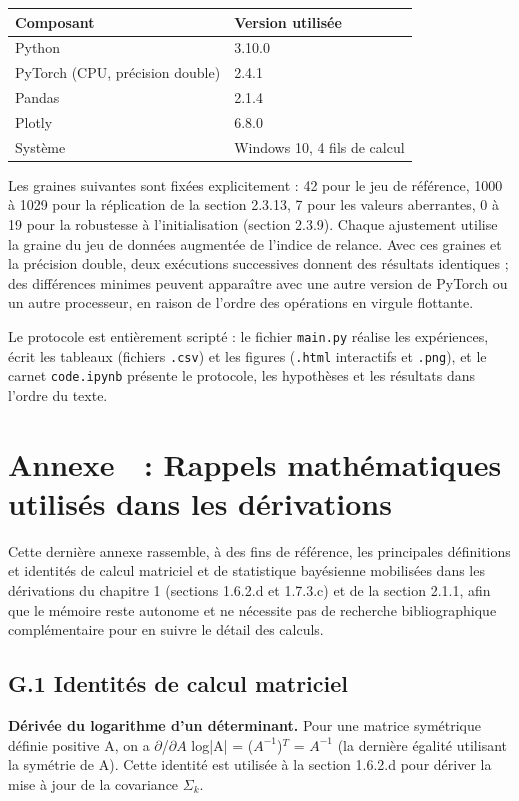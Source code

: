 \begin{table}[H]
\centering
\small
\setlength{\tabcolsep}{0.14cm}
\begin{tabular}{|p{7.42cm}|p{7.42cm}|}
\hline
\textbf{Composant} & \textbf{Version utilisée} \\
\hline
Python & 3.10.0 \\
\hline
PyTorch (CPU, précision double) & 2.4.1 \\
\hline
Pandas & 2.1.4 \\
\hline
Plotly & 6.8.0 \\
\hline
Système & Windows 10, 4 fils de calcul \\
\hline
\end{tabular}
\end{table}
Les graines suivantes sont fixées explicitement : 42 pour le jeu de référence, 1000 à 1029 pour la réplication de la section 2.3.13, 7 pour les valeurs aberrantes, 0 à 19 pour la robustesse à l'initialisation (section 2.3.9). Chaque ajustement utilise la graine du jeu de données augmentée de l'indice de relance. Avec ces graines et la précision double, deux exécutions successives donnent des résultats identiques ; des différences minimes peuvent apparaître avec une autre version de PyTorch ou un autre processeur, en raison de l'ordre des opérations en virgule flottante.

Le protocole est entièrement scripté : le fichier \texttt{main.py} réalise les expériences, écrit les tableaux (fichiers \texttt{.csv}) et les figures (\texttt{.html} interactifs et \texttt{.png}), et le carnet \texttt{code.ipynb} présente le protocole, les hypothèses et les résultats dans l'ordre du texte.

\section*{Annexe  : Rappels mathématiques utilisés dans les dérivations}
Cette dernière annexe rassemble, à des fins de référence, les principales définitions et identités de calcul matriciel et de statistique bayésienne mobilisées dans les dérivations du chapitre 1 (sections 1.6.2.d et 1.7.3.c) et de la section 2.1.1, afin que le mémoire reste autonome et ne nécessite pas de recherche bibliographique complémentaire pour en suivre le détail des calculs.

\subsection*{G.1 Identités de calcul matriciel}
\textbf{Dérivée du logarithme d'un déterminant. }Pour une matrice symétrique définie positive A, on a $\partial $/$\partial A$ log|A| = ($A^{-1}$)$^{T}$ = $A^{-1}$ (la dernière égalité utilisant la symétrie de A). Cette identité est utilisée à la section 1.6.2.d pour dériver la mise à jour de la covariance $\Sigma _{k}$.


